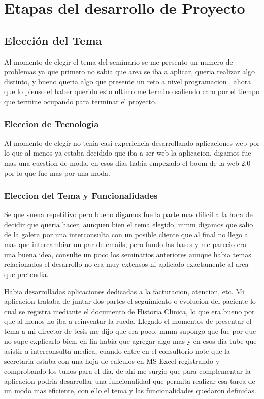 \chapter{Etapas del desarrollo de Proyecto}

\section{Elección del Tema}

Al momento de elegir el tema del seminario se me presento un numero de 
problemas ya que primero no sabia que area se iba a aplicar, queria realizar 
algo distinto, y bueno queria algo que presente un reto a nivel programacion 
, ahora que lo pienso el haber querido esto ultimo me termino saliendo caro por
el tiempo que termine ocupando para terminar el proyecto. 


\subsection{Eleccion de Tecnologia}

Al momento de elegir no tenia casi experiencia desarrollando aplicaciones web 
por lo que al menos ya estaba decidido que iba a ser web la aplicacion, digamos 
fue mas una cuestion de moda, en esos dias habia empezado el boom de la web 2.0
por lo que fue mas por una moda.


\subsection{Eleccion del Tema y Funcionalidades}

Se que suena repetitivo pero bueno digamos fue la parte mas dificil a la hora 
de decidir que queria hacer, aunquen bien el tema elegido, mmm digamos que 
salio de la galera por una interconsulta con un posible cliente que al final no 
llego a mas que intercambiar un par de emails, pero fundo las bases y me 
parecio era una buena idea, consulte un poco los seminarios anteriores aunque 
habia temas relacionados el desarrollo no era muy extensos ni aplicado 
exactamente al area que pretendia.

Habia desarrolladas aplicaciones dedicadas a la facturacion, atencion, etc. Mi 
aplicacion trataba de juntar dos partes el seguimiento o evolucion del paciente
lo cual se registra mediante el documento de Historia Clinica, lo que era bueno 
por que al menos no iba a reinventar la rueda. Llegado el momentos de 
presentar el tema a mi director de tesis me dijo que era poco, mmm supongo que 
fue por que no supe explicarlo bien, en fin habia que agregar algo mas y en 
esos dia tube que asistir a interconsulta medica, cuando entre en el 
consultorio note que la secretaria estaba con una hoja de calculos en MS Excel 
registrando y comprobando los tunos para el dia, de ahi me surgio que para 
complementar la aplicacion podria desarrollar una funcionalidad que permita 
realizar esa tarea de un modo mas eficiente, con ello el tema y las 
funcionalidades quedaron definidas. 


